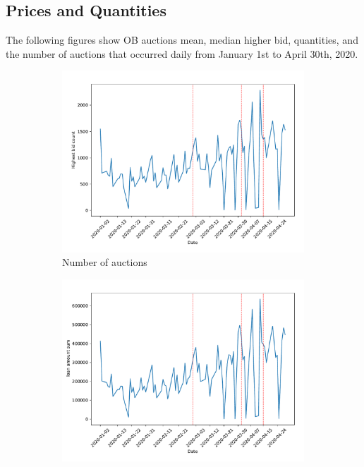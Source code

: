 \documentclass[11pt,a4paper]{article}
\begin{document}
\subsection{Prices and Quantities}

The following figures show OB auctions mean, median higher bid, quantities, and the number of auctions that occurred daily from January 1st to April 30th, 2020.

\begin{figure}[h]
  \centering
  \begin{subfigure}[b]{0.49\textwidth}
      \includegraphics[width=0.998\textwidth]{../results/figures/winner_bid_count_mat30_loan1_timeseries_nr_1_7.pdf}
      \caption{ Number of auctions}
     \end{subfigure}
     \begin{subfigure}[b]{0.49\textwidth}
      \includegraphics[width=0.998\textwidth]{../results/figures/LoanAmount_sum_mat30_loan1_timeseries_nr_1_7.pdf}

\end{subfigure}
\end{figure}
\end{document}
